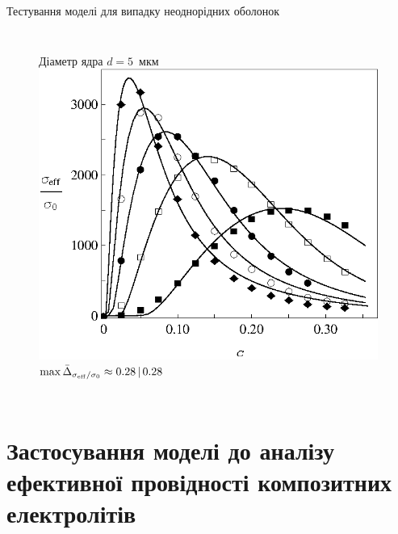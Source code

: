 \documentclass[10pt]{beamer}
\begin{document}
\begin{frame}{Тестування моделі для випадку неоднорідних оболонок}
\begin{columns}[T,onlytextwidth]
      \begin{figure}
        \centering
        { \qquad Діаметр ядра $d=5$~мкм}
        \includegraphics[width=0.99\textwidth]{images/Fig11_Siekierski_d_fixed.eps}
        $\max \bar{\Delta}_{\sigma_{\rm eff}/\sigma_0} \approx 0.28\,|\,0.28$
      \end{figure}
\end{columns}

\end{frame}

\section{Застосування моделі до аналізу ефективної провідності композитних електролітів}%

\end{document}
